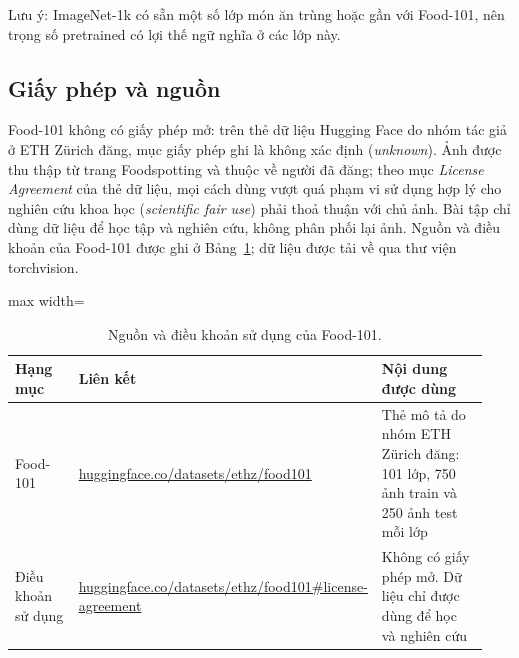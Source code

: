 \documentclass[a4paper,12pt]{article}
\begin{document}
Lưu ý: ImageNet-1k có sẵn một số lớp món ăn trùng hoặc gần với Food-101, nên trọng số pretrained có lợi thế ngữ nghĩa ở các lớp này.

\subsection{Giấy phép và nguồn}\label{sec:a1-license}
Food-101 không có giấy phép mở: trên thẻ dữ liệu Hugging Face do nhóm tác giả ở ETH Zürich đăng, mục giấy phép ghi là không xác định (\emph{unknown}). Ảnh được thu thập từ trang Foodspotting và thuộc về người đã đăng; theo mục \emph{License Agreement} của thẻ dữ liệu, mọi cách dùng vượt quá phạm vi sử dụng hợp lý cho nghiên cứu khoa học (\emph{scientific fair use}) phải thoả thuận với chủ ảnh. Bài tập chỉ dùng dữ liệu để học tập và nghiên cứu, không phân phối lại ảnh. Nguồn và điều khoản của Food-101 được ghi ở Bảng~\ref{tab:a1-links}; dữ liệu được tải về qua thư viện torchvision.

\begin{table}[!htbp]
    \centering
    \small
    \begin{adjustbox}{max width=\linewidth}
        \begin{tabular}{p{0.18\linewidth}>{\raggedright\hyphenpenalty=10000\exhyphenpenalty=10000}p{0.34\linewidth}p{0.42\linewidth}}
            \toprule
            Hạng mục           & Liên kết                                                                                                                                                                        & Nội dung được dùng                                                                \\
            \midrule
            Food-101           & \href{https://huggingface.co/datasets/ethz/food101}{huggingface.co/\allowbreak datasets/\allowbreak ethz/\allowbreak food101}                                                   & Thẻ mô tả do nhóm ETH Zürich đăng: 101 lớp, 750 ảnh train và 250 ảnh test mỗi lớp \\
            \addlinespace
            Điều khoản sử dụng & \href{https://huggingface.co/datasets/ethz/food101\#license-agreement}{huggingface.co/\allowbreak datasets/\allowbreak ethz/\allowbreak food101\#\allowbreak license-agreement} & Không có giấy phép mở. Dữ liệu chỉ được dùng để học và nghiên cứu                 \\
            \bottomrule
        \end{tabular}
    \end{adjustbox}
    \caption{Nguồn và điều khoản sử dụng của Food-101.}
    \label{tab:a1-links}
\end{table}
\end{document}
